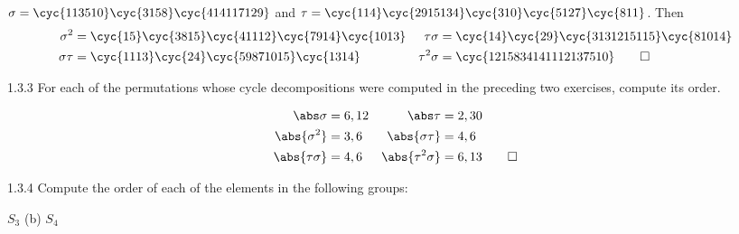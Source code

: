 \begin{sol}
    $\sigma = \cyc{1 13 5 10}\cyc{3 15 8}\cyc{4 14 11 7 12 9}$ and $\tau = \cyc{1 14}\cyc{2 9 15 13 4}\cyc{3 10}\cyc{5 12 7}\cyc{8 11}$. Then
    \begin{align*}
        \sigma^2 & = \cyc{1 5}\cyc{3 8 15}\cyc{4 11 12}\cyc{7 9 14}\cyc{10 13} & \tau\sigma & = \cyc{1 4}\cyc{2 9}\cyc{3 13 12 15 11 5}\cyc{8 10 14} \\
        \sigma\tau & = \cyc{1 11 3}\cyc{2 4}\cyc{5 9 8 7 10 15}\cyc{13 14} & \tau^2\sigma & = \cyc{1 2 15 8 3 4 14 11 12 13 7 5 10} \qedhere
    \end{align*}
\end{sol}

\begin{exercise}{1.3.3}
    For each of the permutations whose cycle decompositions were computed in the preceding two exercises, compute its order.
\end{exercise}

\begin{sol}
    \begin{align*}
        \abs\sigma & = 6, 12 & \abs\tau & = 2, 30 \\
        \abs{\sigma^2} & = 3, 6 & \abs{\sigma\tau} & = 4, 6 \\
        \abs{\tau\sigma} & = 4, 6 & \abs{\tau^2\sigma} & = 6, 13 \qedhere
    \end{align*}
\end{sol}

\begin{exercise}{1.3.4}
    Compute the order of each of the elements in the following groups:
    \begin{subexercises}
        \item $S_3$ \quad (b) $S_4$
    \end{subexercises}
\end{exercise}

